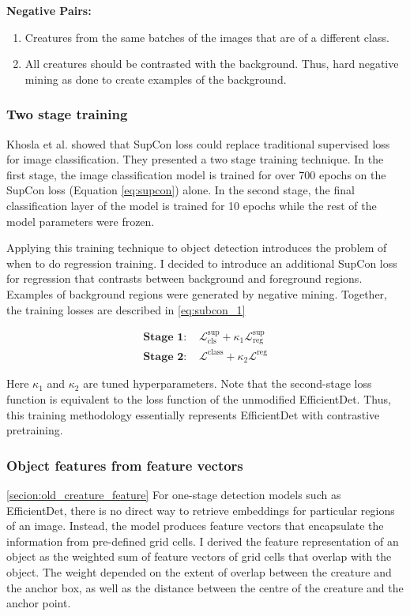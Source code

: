 \documentclass[12pt,a4paper,twoside,openany]{report}
\newcommand{\suploss}{\mathcal{L}^\text{sup}}
\newcommand{\clsloss}{\mathcal{L}^\text{class}}
\newcommand{\regloss}{\mathcal{L}^\text{reg}}
\begin{document}
\textbf{Negative Pairs:}
\begin{enumerate}
    \item Creatures from the same batches of the images that are of a different class.
    \item All creatures should be contrasted with the background. Thus, hard negative mining as done to create examples of the background.
\end{enumerate}

\subsubsection{Two stage training}
Khosla et al. \cite{khosla_supervised_2021} showed that SupCon loss could replace traditional supervised loss for image classification. They presented a two stage training technique. In the first stage, the image classification model is trained for over 700 epochs on the SupCon loss (Equation \ref{eq:supcon}) alone. In the second stage, the final classification layer of the model is trained for 10 epochs while the rest of the model parameters were frozen. 

Applying this training technique to object detection introduces the problem of when to do regression training. I decided to introduce an additional SupCon loss for regression that contrasts between background and foreground regions. Examples of background regions were generated by negative mining. Together, the training losses are described in \ref{eq:subcon_1}


\begin{align*} \label{eq:subcon_1}
    \textbf{Stage 1: }& \suploss_\text{cls} + \kappa_1\suploss_\text{reg}\\
    \textbf{Stage 2: }& \clsloss + \kappa_2 \regloss
\end{align*}

Here $\kappa_1$ and $\kappa_2$ are tuned hyperparameters. 
Note that the second-stage loss function is equivalent to the loss function of the unmodified EfficientDet. Thus, this training methodology essentially represents EfficientDet with contrastive pretraining.

\subsubsection{Object features from feature vectors} \ref{secion:old_creature_feature}
For one-stage detection models such as EfficientDet, there is no direct way to retrieve embeddings for particular regions of an image. Instead, the model produces feature vectors that encapsulate the information from pre-defined grid cells. I derived the feature representation of an object as the weighted sum of feature vectors of grid cells that overlap with the object. The weight depended on the extent of overlap between the creature and the anchor box, as well as the distance between the centre of the creature and the anchor point. 
\end{document}
